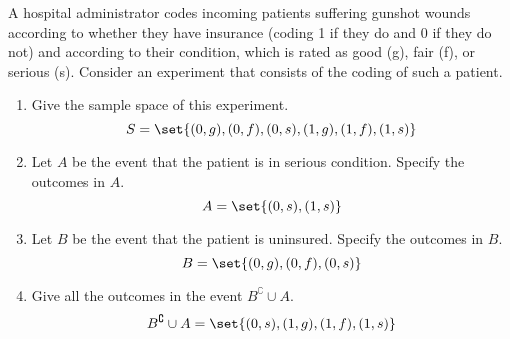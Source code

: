 \item A hospital administrator codes incoming patients suffering gunshot wounds according to whether they have insurance (coding 1 if they do and 0 if they do not) and according to their condition, which is rated as good (g), fair (f), or serious (s). Consider an experiment that consists of the coding of such a patient.
\begin{enumerate}
    \item Give the sample space of this experiment.
    \[
        S = \set{(0,g),(0,f),(0,s),(1,g),(1,f),(1,s)}
    \]
    \item Let $A$ be the event that the patient is in serious condition. Specify the outcomes in $A$.
    \[ A = \set{(0,s),(1,s)} \]
    \item Let $B$ be the event that the patient is uninsured. Specify the outcomes in $B$.
    \[ B = \set{(0,g),(0,f),(0,s)} \]
    \item Give all the outcomes in the event $B^\complement  \cup A$.
    \[ B^\complement  \cup A = \set{(0,s),(1,g),(1,f),(1,s)} \]
\end{enumerate}